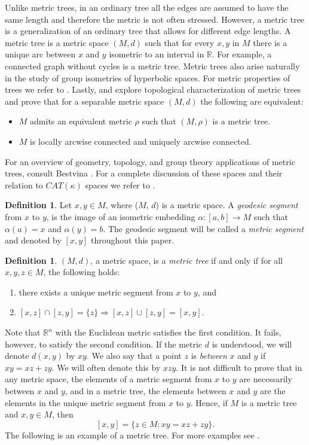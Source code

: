 \documentclass{bcp92}
\theoremstyle{plain}
\theoremstyle{definition}
\newtheorem{defi}[thm]{Definition}
\begin{document}
Unlike metric trees, in an ordinary tree  all the edges are assumed to have
the same length and therefore the metric is not often stressed. However, a
metric tree is a generalization of an ordinary tree that allows for different
edge lengths.  A metric tree is a metric space $(M,d)$ such that for every
$x,y$ in $M$ there is a unique arc between $x$ and $y$ isometric to an
interval in $\mathbb {R}$. For example, a connected graph without cycles is a
metric tree.  Metric trees also arise naturally in the study of group
isometries of hyperbolic spaces. For metric properties of trees we refer to
\cite{buneman}. Lastly, \cite{mmot} and \cite{mo} explore topological
characterization of metric trees and prove that for a separable metric space
$(M,d)$ the following are equivalent:
\begin{itemize}
\item $M$ admits an equivalent metric $\rho$ such that $(M,\rho)$ is a metric
tree.
\item  $M$ is locally arcwise connected and uniquely arcwise connected.
\end{itemize}
For an overview of geometry, topology, and group theory applications of
metric trees, consult Bestvina \cite{Best}. For a complete discussion of
these spaces and their relation to $CAT (\kappa)$ spaces we refer to
\cite{Brid}.

\begin{defi}\label{D:mseg}
    Let $x, y \in M$, where ($M$, $d$) is a metric space.  A \emph{geodesic
segment} from $x$ to $y$, is the image of an isometric embedding $\alpha :
[a,b]\rightarrow M$ such that $\alpha(a)=x$ and $\alpha(y)=b$. The geodesic
segment will be called  a \emph{metric segment} and denoted by $[x,y]$
throughout this paper.
\end{defi}

\begin{defi}\label{D:mt2}
    $(M,d)$, a metric space, is a \emph{metric tree} if and only if for all $x,y,z \in
    M$, the following holds:
    \begin{enumerate}
        \item there exists a unique metric segment from $x$ to $y$,
        and
        \item $[x,z] \cap [z,y] = \{z\} \Rightarrow [x,z] \cup [z,y] = [x,y]$.
    \end{enumerate}
\end{defi}

Note that $\mathbb{R}^n$ with the Euclidean metric satisfies the first
condition. It fails, however, to satisfy the second condition.  If the metric
$d$ is understood, we will denote $d(x,y)$ by $xy$. We also say that a point
$z$ is \textit{between} $x$ and $y$ if $xy = xz + zy$. We will often denote
this by $xzy$. It is not difficult to prove that in any metric space, the
elements of a metric segment from $x$ to $y$ are necessarily between $x$ and
$y$, and in a metric tree, the elements between $x$ and $y$ are the elements
in the unique metric segment from $x$ to $y$. Hence, if $M$ is a metric tree
and $x,y \in M$, then
$$
[x,y] = \{ z \in M : xy = xz + zy \}.
$$
The following is an example of a metric tree. For more examples see
\cite{AkTi}.
\end{document}

